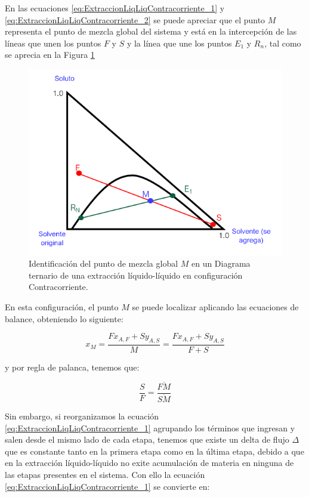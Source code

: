 \documentclass[11pt]{book}
\begin{document}
En las ecuaciones \ref{eq:ExtraccionLiqLiqContracorriente_1} y \ref{eq:ExtraccionLiqLiqContracorriente_2} se puede apreciar que el punto $M$ representa el punto de mezcla global del sistema y está en la intercepción de las líneas que unen los puntos $F$ y $S$ y la línea que une los puntos $E_1$ y $R_n$, tal como se aprecia en la Figura \ref{fig:ExtraccionLiqLiqContraCorriente_3}

\begin{figure}[H]
    \centering
    \includegraphics{img/LiquidoLiquido/ExtraccionLiqLiq_ContraCorriente_3.PNG}
    \caption{Identificación del punto de mezcla global $M$ en un Diagrama ternario de una extracción líquido-líquido en configuración Contracorriente.}
    \label{fig:ExtraccionLiqLiqContraCorriente_3}
\end{figure}

En esta configuración, el punto $M$ se puede localizar aplicando las ecuaciones de balance, obteniendo lo siguiente:

\begin{equation}
    \label{eq:ExtraccionLiqLiqContracorriente_3}
    x_M = \frac{F x_{A,F}+S y_{A,S}}{M} = \frac{F x_{A,F}+S y_{A,S}}{F+S}
\end{equation}

y por regla de palanca, tenemos que:

\begin{equation}
    \label{eq:ExtraccionLiqLiqContracorriente_4}
    \frac{S}{F} = \frac{\overline{FM}}{\overline{SM}}
\end{equation}

Sin embargo, si reorganizamos la ecuación \ref{eq:ExtraccionLiqLiqContracorriente_1} agrupando los términos que ingresan y salen desde el mismo lado de cada etapa, tenemos que existe un delta de flujo $\Delta$ que es constante tanto en la primera etapa como en la última etapa, debido a que en la extracción líquido-líquido no exite acumulación de materia en ninguna de las etapas presentes en el sistema. Con ello la ecuación \ref{eq:ExtraccionLiqLiqContracorriente_1} se convierte en:
\end{document}
